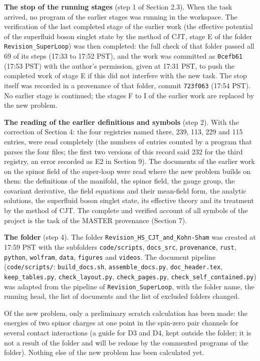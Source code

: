 \documentclass[
  10pt,
]{article}
\begin{document}
\textbf{The stop of the running stages} (step 1 of Section 2.3). When
the task arrived, no program of the earlier stages was running in the
workspace. The verification of the last completed stage of the earlier
work (the effective potential of the superfluid boson singlet state by
the method of CJT, stage E of the folder \texttt{Revision\_SuperLoop})
was then completed: the full check of that folder passed all 69 of its
steps (17:33 to 17:52 PST), and the work was committed as
\texttt{0cefb61} (17:53 PST) with the author's permission, given at
17:31 PST, to push the completed work of stage E if this did not
interfere with the new task. The stop itself was recorded in a
provenance of that folder, commit \texttt{723f063} (17:54 PST). No
earlier stage is continued; the stages F to I of the earlier work are
replaced by the new problem.

\textbf{The reading of the earlier definitions and symbols} (step 2).
With the correction of Section 4: the four registries named there, 239,
113, 229 and 115 entries, were read completely (the numbers of entries
counted by a program that parses the four files; the first two versions
of this record said 232 for the third registry, an error recorded as E2
in Section 9). The documents of the earlier work on the spinor field of
the super-loop were read where the new problem builds on them: the
definitions of the manifold, the spinor field, the gauge group, the
covariant derivative, the field equations and their mean-field form, the
analytic solutions, the superfluid boson singlet state, its effective
theory and its treatment by the method of CJT. The complete and verified
account of all symbols of the project is the task of the MASTER
provenance (Section 7).

\textbf{The folder} (step 4). The folder
\texttt{Revision\_HS\_CJT\_and\_Kohn-Sham} was created at 17:59 PST with
the subfolders \texttt{code/scripts}, \texttt{docs\_src},
\texttt{provenance}, \texttt{rust}, \texttt{python}, \texttt{wolfram},
\texttt{data}, \texttt{figures} and \texttt{videos}. The document
pipeline (\texttt{code/scripts/}: \texttt{build\_docs.sh},
\texttt{assemble\_docs.py}, \texttt{doc\_header.tex},
\texttt{keep\_tables.py}, \texttt{check\_layout.py},
\texttt{check\_pages.py}, \texttt{check\_self\_contained.py}) was
adapted from the pipeline of \texttt{Revision\_SuperLoop}, with the
folder name, the running head, the list of documents and the list of
excluded folders changed.

Of the new problem, only a preliminary scratch calculation has been
made: the energies of two spinor charges at one point in the spin-zero
pair channels for several contact interactions (a guide for D3 and D4,
kept outside the folder; it is not a result of the folder and will be
redone by the commented programs of the folder). Nothing else of the new
problem has been calculated yet.
\end{document}
